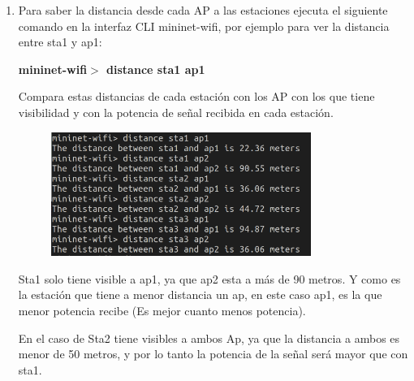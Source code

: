 \documentclass[12pt, a4paper]{report}
\begin{document}
\begin{enumerate}
\begin{figure}[H]
	\end{figure}
	\item Para saber la distancia desde cada AP a las estaciones ejecuta el siguiente comando en la interfaz
	CLI mininet-wifi, por ejemplo para ver la distancia entre sta1 y ap1:
	\begin{center}
		\textbf{mininet-wifi$>$ distance sta1 ap1}
	\end{center}
	Compara estas distancias de cada estación con los AP con los que tiene visibilidad y con la
	potencia de señal recibida en cada estación.\\
	\begin{figure}[H]
		\centering
		\includegraphics[width=0.8\textwidth]{ej1.15}
	\end{figure}
	Sta1 solo tiene visible a ap1, ya que ap2 esta a más de 90 metros. Y como es la estación que tiene a menor distancia un ap, en este caso ap1, es la que menor potencia recibe (Es mejor cuanto menos potencia).
	
	En el caso de Sta2 tiene visibles a ambos Ap, ya que la distancia a ambos es menor de 50 metros, y por lo tanto la potencia de la señal será mayor que con sta1.
	

\end{enumerate}
\end{document}
